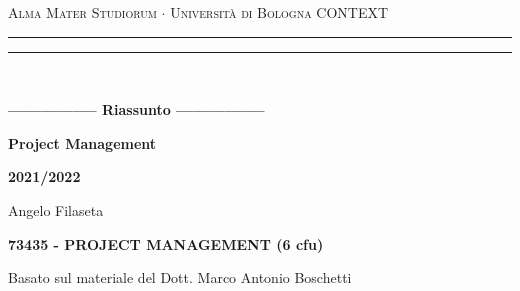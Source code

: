 \begin{titlepage}
    \begin{center}
        {{\Large{\textsc{Alma Mater Studiorum $\cdot$ Università di Bologna}}}}
        {{\Large{\textsc{CONTEXT}}}}
        \rule[0.1cm]{15.8cm}{0.1mm}
        \rule[0.5cm]{15.8cm}{0.6mm}
        \\
        \vspace{3mm}
    \end{center}
    \vspace{2mm}
    \begin{center}
        {\LARGE{\bf{----------------- Riassunto -----------------}}}
        \vspace{5mm} \par \noindent
        {\Huge{\bf{Project Management}}}
        \vspace{10mm} \par \noindent
        {\LARGE \bf{2021/2022}}
        \vspace{15mm} \par \noindent
        {\Large Angelo Filaseta}
        \vspace{15mm} \par \noindent
        {\LARGE \bf{73435 - PROJECT MANAGEMENT (6 cfu)}}
        \vspace{8mm} \par \noindent
        {\Large Basato sul materiale del Dott. Marco Antonio Boschetti \cite{MarcoAnt98:online}}
	\end{center}
    \hfill
    \vspace{40mm}
\end{titlepage}
